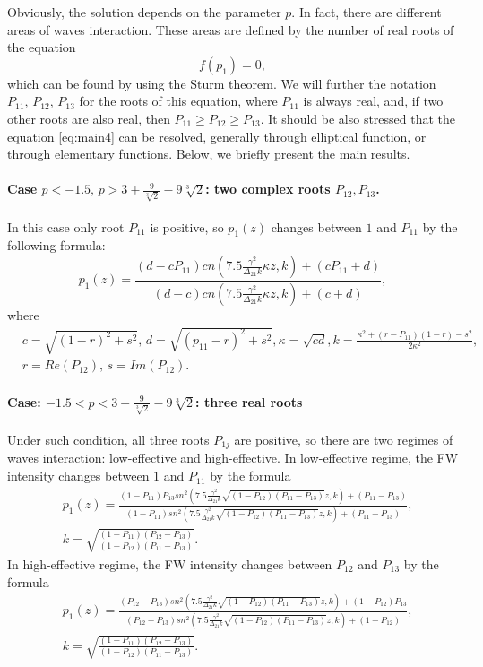 \documentclass[a4paper, 12pt, onecolumn]{extarticle}
\begin{document}
{
Obviously, the solution depends on the parameter $p$. In fact, there are different areas of waves interaction. These areas are defined by the number of real roots of the equation
$$
f(p_1)=0,
$$
which can be found by using the Sturm theorem. We will further the notation $P_{11},\,P_{12},\,P_{13}$ for the roots of this equation, where $P_{11}$ is always real, and, if two other roots are also real, then $P_{11}\ge P_{12}\ge P_{13}$. It should be also stressed that the equation \eqref{eq:main4} can be resolved, generally through elliptical function, or through elementary functions. Below, we briefly present the main results.
\paragraph*{Case $p<-1.5,\,p>3 + \frac{9}{\sqrt[3]{2}}-9\sqrt[3]{ 2}$: two complex roots $P_{12},P_{13}$.}
In this case only root $P_{11}$ is positive, so $p_1(z)$ changes between $1$ and $P_{11}$ by the following formula:
\begin{equation}
\label{eq:p1_1}
p_1(z)=\frac{(d-cP_{11})cn(7.5\frac{\gamma^2}{\Delta_{21}k}\kappa z,k)+(cP_{11}+d)}{(d-c)cn(7.5\frac{\gamma^2}{\Delta_{21}k}\kappa z,k)+(c+d)},
\end{equation}
where
$$
\begin{aligned}
&c=\sqrt{(1-r)^2+s^2},\, d=\sqrt{(p_{11}-r)^2+s^2}, \kappa=\sqrt{cd}, k=\frac{\kappa^2+(r-P_{11})(1-r)-s^2}{2\kappa^2},\\
&r=Re(P_{12}),\, s=Im (P_{12}).
\end{aligned}
$$
\paragraph*{Case: $-1.5<p<3 + \frac{9}{\sqrt[3]{2}}-9\sqrt[3]{ 2}$: three real roots}
Under such condition, all three roots $P_{1j}$ are positive, so there are two regimes of waves interaction: low-effective and high-effective. In low-effective regime, the FW intensity changes between $1$ and $P_{11}$ by the formula
\begin{equation}
\label{eq:p1_2}
\begin{aligned}
&p_1(z)=\frac{(1-P_{11})P_{13}sn^2(7.5\frac{\gamma^2}{\Delta_{21}k}\sqrt{(1-P_{12})(P_{11}-P_{13})}z,k)+(P_{11}-P_{13})}{(1-P_{11})sn^2(7.5\frac{\gamma^2}{\Delta_{21}k} \sqrt{(1-P_{12})(P_{11}-P_{13})}z,k)+(P_{11}-P_{13})},\\
&k=\sqrt{\frac{(1-P_{11})(P_{12}-P_{13})}{(1-P_{12})(P_{11}-P_{13})}}.
\end{aligned}
\end{equation} 
In high-effective regime, the FW intensity changes between $P_{12}$ and $P_{13}$ by the formula
\begin{equation}
\label{eq:p1_2bis}
\begin{aligned}
&p_1(z)=\frac{(P_{12}-P_{13})sn^2(7.5\frac{\gamma^2}{\Delta_{21}k}\sqrt{(1-P_{12})(P_{11}-P_{13})}z,k)+(1-P_{12})P_{13}}{(P_{12}-P_{13})sn^2(7.5\frac{\gamma^2}{\Delta_{21}k}\sqrt{(1-P_{12})(P_{11}-P_{13})}z,k)+(1-P_{12})},\\
&k=\sqrt{\frac{(1-P_{11})(P_{12}-P_{13})}{(1-P_{12})(P_{11}-P_{13})}}.
\end{aligned}
\end{equation}
}
\end{document}
